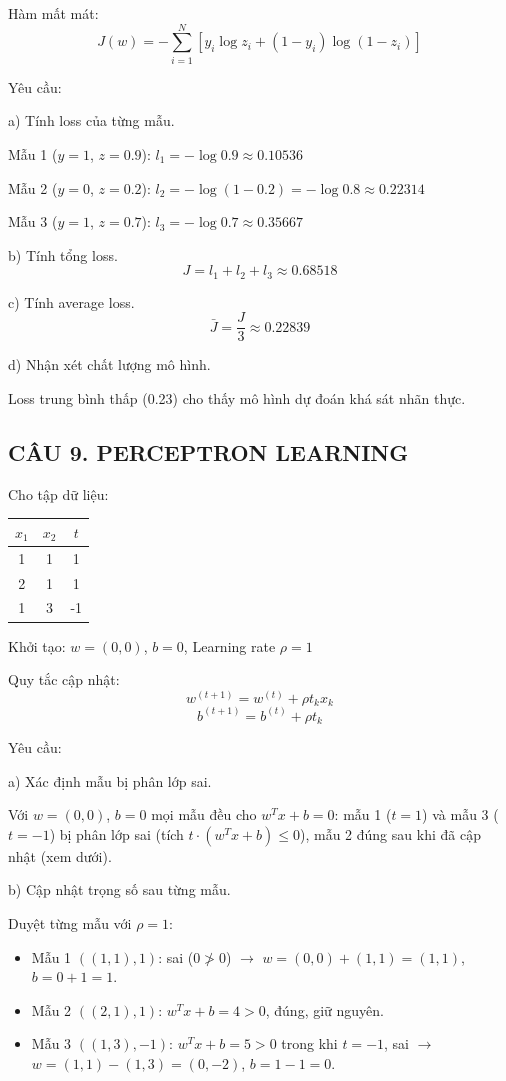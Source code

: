 \documentclass[a4paper,12pt]{article}
\begin{document}
Hàm mất mát:
\[ J(w) = -\sum_{i=1}^{N}\left[ y_i \log z_i + (1 - y_i)\log(1 - z_i) \right] \]

Yêu cầu:

a) Tính loss của từng mẫu.

Mẫu 1 ($y = 1$, $z = 0.9$): $l_1 = -\log 0.9 \approx 0.10536$

Mẫu 2 ($y = 0$, $z = 0.2$): $l_2 = -\log(1 - 0.2) = -\log 0.8 \approx 0.22314$

Mẫu 3 ($y = 1$, $z = 0.7$): $l_3 = -\log 0.7 \approx 0.35667$

b) Tính tổng loss.
\[ J = l_1 + l_2 + l_3 \approx 0.68518 \]

c) Tính average loss.
\[ \bar{J} = \frac{J}{3} \approx 0.22839 \]

d) Nhận xét chất lượng mô hình.

Loss trung bình thấp (0.23) cho thấy mô hình dự đoán khá sát nhãn thực.

\subsection*{CÂU 9. PERCEPTRON LEARNING}

Cho tập dữ liệu:
\begin{center}
\begin{tabular}{|c|c|c|}
\hline
$x_1$ & $x_2$ & $t$ \\
\hline
1 & 1 & 1 \\
2 & 1 & 1 \\
1 & 3 & -1 \\
\hline
\end{tabular}
\end{center}

Khởi tạo: $w = (0, 0)$, $b = 0$, Learning rate $\rho = 1$

Quy tắc cập nhật:
\[ w^{(t+1)} = w^{(t)} + \rho t_k x_k \]
\[ b^{(t+1)} = b^{(t)} + \rho t_k \]

Yêu cầu:

a) Xác định mẫu bị phân lớp sai.

Với $w = (0,0)$, $b = 0$ mọi mẫu đều cho $w^T x + b = 0$:
mẫu 1 ($t = 1$) và mẫu 3 ($t = -1$) bị phân lớp sai (tích $t \cdot (w^T x + b) \le 0$),
mẫu 2 đúng sau khi đã cập nhật (xem dưới).

b) Cập nhật trọng số sau từng mẫu.

Duyệt từng mẫu với $\rho = 1$:
\begin{itemize}
  \item Mẫu 1 $((1,1), 1)$: sai ($0 \not> 0$) $\to$ $w = (0,0) + (1,1) = (1,1)$, $b = 0 + 1 = 1$.
  \item Mẫu 2 $((2,1), 1)$: $w^T x + b = 4 > 0$, đúng, giữ nguyên.
  \item Mẫu 3 $((1,3), -1)$: $w^T x + b = 5 > 0$ trong khi $t = -1$, sai
        $\to$ $w = (1,1) - (1,3) = (0,-2)$, $b = 1 - 1 = 0$.
\end{itemize}
\end{document}
